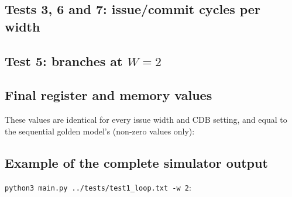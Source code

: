 \documentclass[11pt]{article}
\begin{document}
\subsection{Tests 3, 6 and 7: issue/commit cycles per width}
\begin{table}[H]\centering\small

\caption{\texttt{test3} (dependence chain, CDB width $=W$): instructions issue earlier, but each waits for its predecessor.}
\end{table}
\begin{table}[H]\centering\small

\caption{\texttt{test6} (4-entry ROB, 1 CDB): the same total cycle count at every width. Issue stalls in order on a full ROB or RS (e.g.\ \texttt{Add.d F7} waits until the single FP-adder reservation station frees in cycle 10).}
\end{table}
\begin{table}[H]\centering\small

\caption{\texttt{test7} (sample report Test Case \#01, CDB width $=W$).}
\end{table}

\subsection{Test 5: branches at \texorpdfstring{$W=2$}{W=2}}
\begin{table}[H]\centering\scriptsize

\caption{\texttt{test5} at $W{=}2$ (1 CDB), committed instructions only. \tFiveWtwoSquashed{} wrong-path instructions
were issued and squashed. Every gap in the ISSUE column after a branch resolves is the
$n \to n{+}2$ restart.}
\end{table}

\subsection{Final register and memory values}\label{sec:final}
These values are identical for every issue width and CDB setting, and equal to the sequential
golden model's (non-zero values only):


\subsection{Example of the complete simulator output}
\texttt{python3 main.py ../tests/test1\_loop.txt -w 2}:
{\lstset{basicstyle=\ttfamily\scriptsize}}
\end{document}
